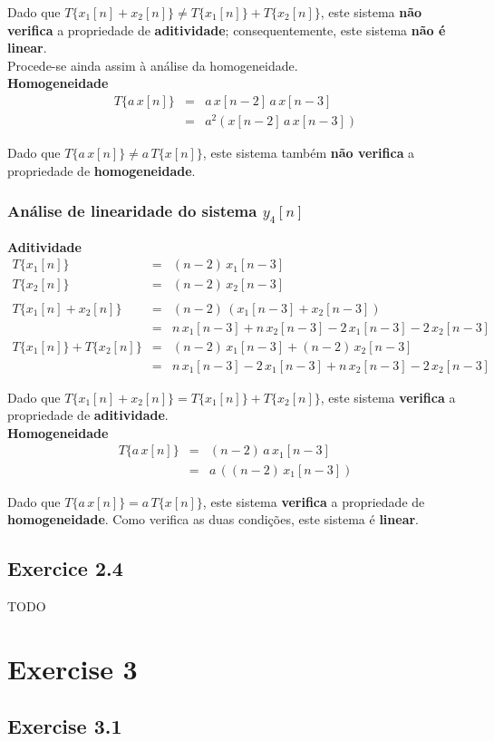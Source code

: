 \documentclass[a4paper]{article}
\begin{document}
\noindent Dado que $T\{x_{1}[n] + x_{2}[n]\} \neq T\{x_{1}[n]\} + T\{x_{2}[n]\}$, este sistema \textbf{não verifica} a propriedade de \textbf{aditividade}; consequentemente, este sistema \textbf{não é linear}. \\
Procede-se ainda assim à análise da homogeneidade. \\

\noindent \textbf{Homogeneidade}
\begin{eqnarray}
	T\{a \, x[n]\}					& = & a \, x[n - 2] \, a \, x[n - 3] \\
									& = & a^2 (x[n - 2] \, a \, x[n - 3])
\end{eqnarray}

\noindent Dado que $T\{a \, x[n]\} \neq a \, T\{x[n]\}$, este sistema também \textbf{não verifica} a propriedade de \textbf{homogeneidade}.

\subsubsection{Análise de linearidade do sistema $y_{4}[n]$}
\noindent \textbf{Aditividade}
\begin{eqnarray}
	T\{x_{1}[n]\}					& = & (n - 2) \, x_{1}[n - 3] \\
	T\{x_{2}[n]\}					& = & (n - 2) \, x_{2}[n - 3] \\
	\nonumber \\
	T\{x_{1}[n] + x_{2}[n]\}		& = & (n - 2) \, (x_{1}[n - 3] + x_{2}[n - 3]) \\
									& = & n \, x_{1}[n - 3] + n \, x_{2}[n - 3] - 2 \, x_{1}[n - 3] - 2 \, x_{2}[n - 3] \\
	T\{x_{1}[n]\} + T\{x_{2}[n]\}	& = & (n - 2) \, x_{1}[n - 3] + (n - 2) \, x_{2}[n - 3] \\
									& = & n \, x_{1}[n - 3] - 2 \, x_{1}[n - 3] + n \, x_{2}[n - 3] - 2 \, x_{2}[n - 3]
\end{eqnarray}

\noindent Dado que $T\{x_{1}[n] + x_{2}[n]\} = T\{x_{1}[n]\} + T\{x_{2}[n]\}$, este sistema \textbf{verifica} a propriedade de \textbf{aditividade}. \\

\noindent \textbf{Homogeneidade}
\begin{eqnarray}
	T\{a \, x[n]\}					& = & (n - 2) \, a \, x_{1}[n - 3] \\
									& = & a \, ((n - 2) \, x_{1}[n - 3])
\end{eqnarray}

\noindent Dado que $T\{a \, x[n]\} = a \, T\{x[n]\}$, este sistema \textbf{verifica} a propriedade de \textbf{homogeneidade}. Como verifica as duas condições, este sistema é \textbf{linear}.

\subsection{Exercice 2.4}
\noindent TODO

\section{Exercise 3}
\subsection{Exercise 3.1}
\indent \indent 

\end{document}
